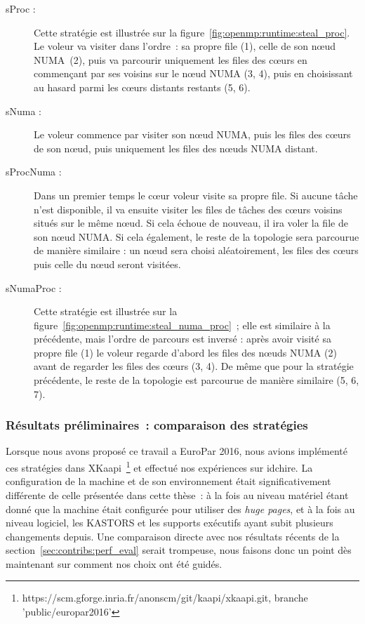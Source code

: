 \begin{description}
  \item [sProc :] Cette stratégie est illustrée sur la figure~\ref{fig:openmp:runtime:steal_proc}. Le voleur va visiter dans l'ordre~: sa propre file (1), celle de son nœud NUMA (2), puis va parcourir uniquement les files des cœurs en commençant par ses voisins sur le nœud NUMA (3, 4), puis en choisissant au hasard parmi les cœurs distants restants (5, 6).
  \item [sNuma :] Le voleur commence par visiter son nœud NUMA, puis les files des cœurs de son nœud, puis uniquement les files des nœuds NUMA distant.
  \item [sProcNuma :] Dans un premier temps le cœur voleur visite sa propre file. Si aucune tâche n'est disponible, il va ensuite visiter les files de tâches des cœurs voisins situés sur le même nœud.
    Si cela échoue de nouveau, il ira voler la file de son nœud NUMA.
    Si cela également, le reste de la topologie sera parcourue de manière similaire : un nœud sera choisi aléatoirement, les files des cœurs puis celle du nœud seront visitées.
  \item [sNumaProc :] Cette stratégie est illustrée sur la figure~\ref{fig:openmp:runtime:steal_numa_proc}~; elle est similaire à la précédente, mais l'ordre de parcours est inversé : après avoir visité sa propre file (1) le voleur regarde d'abord les files des nœuds NUMA (2) avant de regarder les files des cœurs (3, 4). De même que pour la stratégie précédente, le reste de la topologie est parcourue de manière similaire (5, 6, 7).
\end{description}

\subsubsection{Résultats préliminaires~: comparaison des stratégies}
\label{sec:openmp:runtime:preliminary_results}

Lorsque nous avons proposé ce travail a EuroPar 2016, nous avions implémenté ces stratégies dans XKaapi~\footnote{https://scm.gforge.inria.fr/anonscm/git/kaapi/xkaapi.git, branche 'public/europar2016'} et effectué nos expériences sur idchire.
La configuration de la machine et de son environnement était significativement différente de celle présentée dans cette thèse~: à la fois au niveau matériel étant donné que la machine était configurée pour utiliser des \emph{huge pages}, et à la fois au niveau logiciel, les KASTORS et les supports exécutifs ayant subit plusieurs changements depuis.
Une comparaison directe avec nos résultats récents de la section~\ref{sec:contribs:perf_eval} serait trompeuse, nous faisons donc un point dès maintenant sur comment nos choix ont été guidés.

